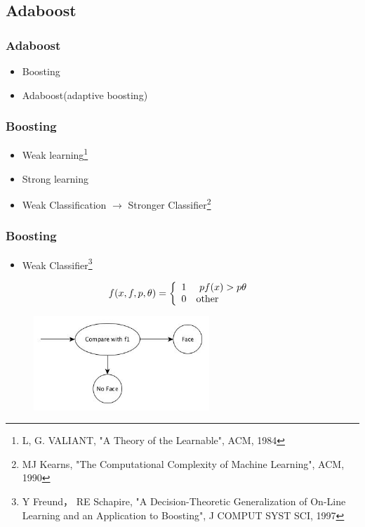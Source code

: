 \documentclass[10pt]{beamer}
\begin{document}
\subsection{Adaboost}
\begin{frame}
    \frametitle{Adaboost}
    \begin{itemize}
   \item Boosting
   \item Adaboost(adaptive boosting)
   \end{itemize} 
\end{frame}


\begin{frame}
    \frametitle{Boosting}
   \begin{itemize}
 \item Weak learning\footnote{L, G. VALIANT, "A Theory of the Learnable", ACM, 1984}
 \item Strong learning
  \item Weak Classification $\longrightarrow$  Stronger Classifier\footnote{MJ Kearns, "The Computational Complexity of Machine Learning", ACM, 1990}
  \end{itemize}
 \end{frame}


\begin{frame}
   \frametitle{Boosting}
   \begin{itemize}
   \item Weak Classifier\footnote{Y Freund， RE Schapire, "A Decision-Theoretic Generalization of On-Line Learning and an Application to Boosting", J COMPUT SYST SCI, 1997}
   \end{itemize}
   \begin{displaymath}
   f(x,f,p, \theta ) = \left \{ \begin{array}{ll}
   1 & \textrm{ $ pf(x)>p\theta $ }\\
   0 & \textrm{other} 
    \end{array} \right.
   \end{displaymath}
   \begin{figure}[!ht]
   \centering
   \includegraphics[width=2.6in]{classifier.jpg}
   \end{figure}
\end{frame}
\end{document}
